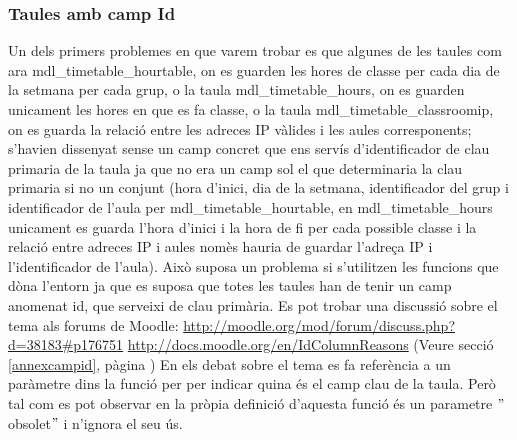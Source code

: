 \documentclass[a4paper]{report}  %
\begin{document}
\subsubsection{Taules amb camp Id}
Un dels primers problemes en que varem trobar es que algunes de les taules com ara mdl\_timetable\_hourtable, on es guarden les hores de classe per cada dia de la setmana per cada grup, o la taula mdl\_timetable\_hours, on es guarden unicament les hores en que es fa classe, o la taula mdl\_timetable\_classroomip, on es guarda la relació entre les adreces IP vàlides i les aules corresponents; s'havien dissenyat sense un camp concret que ens servís d'identificador de clau primaria de la taula ja que no era un camp sol el que determinaria la clau primaria si no un conjunt (hora d'inici, dia de la setmana, identificador del grup i identificador de l'aula per mdl\_timetable\_hourtable, en mdl\_timetable\_hours unicament es guarda l'hora d'inici i la hora de fi per cada possible classe i la relació entre adreces IP i aules nomès hauria de guardar l'adreça IP i l'identificador de l'aula).
Això suposa un problema si s'utilitzen les funcions que dòna l'entorn ja que es suposa que totes les taules han de tenir un camp anomenat id, que serveixi de clau primària. 
Es pot trobar una discussió sobre el tema als forums de Moodle: \url{http://moodle.org/mod/forum/discuss.php?d=38183#p176751} 
\url{http://docs.moodle.org/en/IdColumnReasons} (Veure secció \ref{annexcampid}, pàgina \pageref{annexcampid} )
En els debat sobre el tema es fa referència a un paràmetre dins la funció per per indicar quina és el camp clau de la taula. Però tal com es pot observar en la pròpia definició d'aquesta funció és un parametre $"$obsolet$"$ i n'ignora el seu ús.
\end{document}
